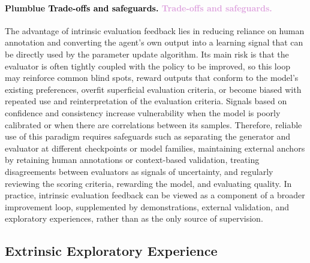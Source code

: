 \documentclass{article}
\let\oldtextcolor\textcolor
\renewcommand{\textcolor}[2]{
  \def\temp{#1}
  \def\red{blue}
  \ifx\temp\red
    \oldtextcolor{black}{#2}
  \else
    \oldtextcolor{#1}{#2}
  \fi
}
\begin{document}
\paragraph{\textcolor{Plum}{Trade-offs and safeguards.}}
The advantage of intrinsic evaluation feedback lies in reducing reliance on human annotation and converting the agent's own output into a learning signal that can be directly used by the parameter update algorithm. Its main risk is that the evaluator is often tightly coupled with the policy to be improved, so this loop may reinforce common blind spots, reward outputs that conform to the model's existing preferences, overfit superficial evaluation criteria, or become biased with repeated use and reinterpretation of the evaluation criteria. Signals based on confidence and consistency increase vulnerability when the model is poorly calibrated or when there are correlations between its samples. Therefore, reliable use of this paradigm requires safeguards such as separating the generator and evaluator at different checkpoints or model families, maintaining external anchors by retaining human annotations or context-based validation, treating disagreements between evaluators as signals of uncertainty, and regularly reviewing the scoring criteria, rewarding the model, and evaluating quality. In practice, intrinsic evaluation feedback can be viewed as a component of a broader improvement loop, supplemented by demonstrations, external validation, and exploratory experiences, rather than as the only source of supervision.


\subsection{Extrinsic Exploratory Experience}
\label{sec:Extrinsic_Exploratory_Experience}
\label{sec:Self_Generated_Experience}
\end{document}
